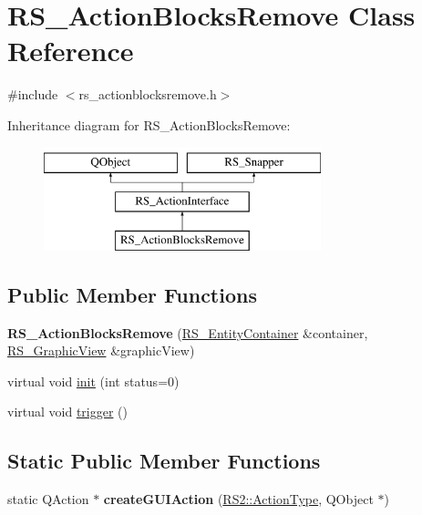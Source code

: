 \hypertarget{classRS__ActionBlocksRemove}{\section{R\-S\-\_\-\-Action\-Blocks\-Remove Class Reference}
\label{classRS__ActionBlocksRemove}
}


{\ttfamily \#include $<$rs\-\_\-actionblocksremove.\-h$>$}

Inheritance diagram for R\-S\-\_\-\-Action\-Blocks\-Remove\-:\begin{figure}[H]
\begin{center}
\leavevmode
\includegraphics[height=3.000000cm]{classRS__ActionBlocksRemove}
\end{center}
\end{figure}
\subsection*{Public Member Functions}
\begin{DoxyCompactItemize}
\item 
\hypertarget{classRS__ActionBlocksRemove_a53dae4fc02fed4ff4c274a3ddb6c9b39}{{\bfseries R\-S\-\_\-\-Action\-Blocks\-Remove} (\hyperlink{classRS__EntityContainer}{R\-S\-\_\-\-Entity\-Container} \&container, \hyperlink{classRS__GraphicView}{R\-S\-\_\-\-Graphic\-View} \&graphic\-View)}\label{classRS__ActionBlocksRemove_a53dae4fc02fed4ff4c274a3ddb6c9b39}

\item 
virtual void \hyperlink{classRS__ActionBlocksRemove_a8743536c35090ebb238e82c760d7df08}{init} (int status=0)
\item 
virtual void \hyperlink{classRS__ActionBlocksRemove_a7408cd0f8298e544fdbafe432cf4408f}{trigger} ()
\end{DoxyCompactItemize}
\subsection*{Static Public Member Functions}
\begin{DoxyCompactItemize}
\item 
\hypertarget{classRS__ActionBlocksRemove_a25b2e7af17b2a44cd57564ba51d1df09}{static Q\-Action $\ast$ {\bfseries create\-G\-U\-I\-Action} (\hyperlink{classRS2_afe3523e0bc41fd637b892321cfc4b9d7}{R\-S2\-::\-Action\-Type}, Q\-Object $\ast$)}\label{classRS__ActionBlocksRemove_a25b2e7af17b2a44cd57564ba51d1df09}

\end{DoxyCompactItemize}
